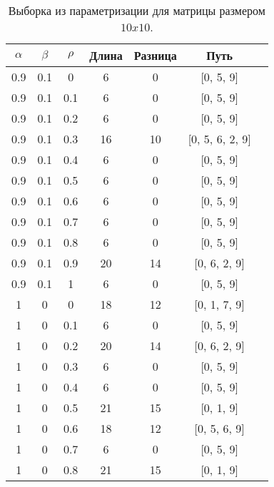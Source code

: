 \begin{table}[H]

	\caption{Выборка из параметризации для матрицы размером $10x10$.}
	\label{tab:v5}
	\begin{center}

		\begin{tabular}{|c@{\hspace{7mm}}|c@{\hspace{7mm}}|c@{\hspace{7mm}}|c@{\hspace{7mm}}|c@{\hspace{7mm}}|c@{\hspace{7mm}}|c|}

			\hline
			$\alpha$        & $\beta$      & $\rho$      &Длина  & Разница & Путь \\

			\hline
0.9  & 0.1  & 0    & 6     & 0     & [0, 5, 9]\\
0.9  & 0.1  & 0.1  & 6     & 0     & [0, 5, 9]\\
0.9  & 0.1  & 0.2  & 6     & 0     & [0, 5, 9]\\
0.9  & 0.1  & 0.3  & 16    & 10    & [0, 5, 6, 2, 9]\\
\hline
0.9  & 0.1  & 0.4  & 6     & 0     & [0, 5, 9]\\
0.9  & 0.1  & 0.5  & 6     & 0     & [0, 5, 9]\\
0.9  & 0.1  & 0.6  & 6     & 0     & [0, 5, 9]\\
0.9  & 0.1  & 0.7  & 6     & 0     & [0, 5, 9]\\
\hline
0.9  & 0.1  & 0.8  & 6     & 0     & [0, 5, 9]\\
0.9  & 0.1  & 0.9  & 20    & 14    & [0, 6, 2, 9]\\
0.9  & 0.1  & 1    & 6     & 0     & [0, 5, 9]\\
1    & 0    & 0    & 18    & 12    & [0, 1, 7, 9]\\
\hline
1    & 0    & 0.1  & 6     & 0     & [0, 5, 9]\\
1    & 0    & 0.2  & 20    & 14    & [0, 6, 2, 9]\\
1    & 0    & 0.3  & 6     & 0     & [0, 5, 9]\\
1    & 0    & 0.4  & 6     & 0     & [0, 5, 9]\\
\hline
1    & 0    & 0.5  & 21    & 15    & [0, 1, 9]\\
1    & 0    & 0.6  & 18    & 12    & [0, 5, 6, 9]\\
1    & 0    & 0.7  & 6     & 0     & [0, 5, 9]\\
1    & 0    & 0.8  & 21    & 15    & [0, 1, 9]\\
		\hline
		\end{tabular}
	\end{center}
\end{table}

